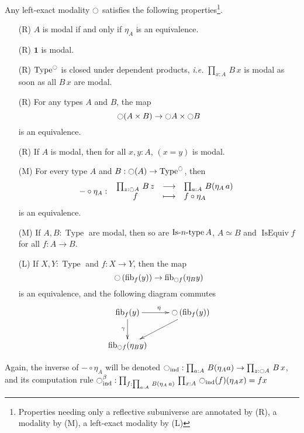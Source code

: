 \documentclass[notfinal]{jfrarticle}
\DeclareMathOperator{\Type}{Type}
\DeclareMathOperator{\IsEquiv}{IsEquiv}
\def\mymathhyphen{{\hbox{-}}}
\newcommand{\IsType}[1]
{\mathop{\mathrm{Is\mymathhyphen}#1\mathrm{\mymathhyphen type}} }
\newcommand{\modal}{\ensuremath{\ocircle}}
\newcommand \fib[2] {\mathrm{fib}_{#1}(#2)}
\newcommand \one {\mathbf{1}}
\newcommand{\prodD}[3]{\prod_{#1:#2}\, #3}
\newcommand{\fonction}[5]{ %
	#1 \, \colon \left.
	 \begin{array}{ccl}
		#2 & \longrightarrow & #3 \\
		#4 & \longmapsto & #5
	\end{array}
	\right.
}
\newcommand{\ie}{\emph{i.e.}}
\begin{document}
\begin{prop}\label{prop:mod_prop}
  Any left-exact modality $\modal$ satisfies the following
  properties\footnote{Properties needing only a reflective subuniverse
    are annotated by (R), a modality by (M), a left-exact modality by (L)}.
  \begin{itemize}
  \item[\labelitemi(R)] $A$ is modal if and only if $\eta_A$ is an equivalence.
  \item[\labelitemi(R)] $\one$ is modal.
  \item[\labelitemi(R)] $\Type^\modal$ is closed under dependent
    products, \ie{} $\prodD x A {B\, x}$ is modal as soon as all $B\,
    x$ are modal.
  \item[\labelitemi(R)] For any types $A$ and $B$, the map
    \[ \modal(A\times B) \to \modal A \times\modal B \]
    is an equivalence.
  \item[\labelitemi(R)] If $A$ is modal, then for all $x,y:A$, $(x=y)$
    is modal.
  \item[\labelitemi(M)] For every type $A$ and $B:\modal(A)\to\Type^\modal$, then
    \[ \fonction{-\circ\eta_A}{\prodD z {\modal A} {B\, z}}{\prodD a
        A {B(\eta_A\, a)}}{f}{f\circ \eta_A} \]
    is an equivalence.
  \item[\labelitemi(M)] If $A,B:\Type$ are modal, then so are $\IsType
    n A$, $A\simeq B$ and $\IsEquiv f$ for all $f:A\to B$.
  \item[\labelitemi(L)] If $X,Y:\Type$ and $f:X\to Y$, then the map
    \[ \modal \left( \fib f y\right) \to \fib{\modal f}{\eta_B
        y} \]
    is an equivalence, and the following diagram commutes
\[ \xymatrix{
  \fib f y \ar[r]^\eta \ar[d]_\gamma & \modal \left(\fib f y \right) \ar[dl]\\
  \fib{\modal f}{\eta_B y} & }\] 
  \end{itemize}
\end{prop}

\begin{rmq}
  Again, the inverse of $- \circ \eta_A$ will be denoted
  $\modal_{\mathrm{ind}} : \prodD a A {B (\eta_A a)} \to \prodD z
  {\modal A} {B\, x}$, and its computation rule
  $\modal_{\mathrm{ind}}^\beta : \prodD f {\prodD a
        A {B(\eta_A\, a)}} {\prodD x A
        {\modal_{\mathrm{ind}}(f)(\eta_A x) }} = f x$
\end{rmq}
\end{document}
